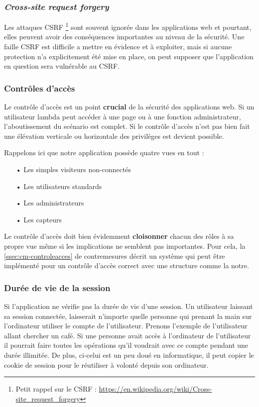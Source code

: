 \subsubsection{\emph{Cross-site request forgery}}

Les attaques CSRF \footnote{Petit rappel sur le CSRF : \url{https://en.wikipedia.org/wiki/Cross-site_request_forgery}} sont souvent ignorée dans les applications web et pourtant, elles peuvent avoir des conséquences importantes au niveau de la sécurité. Une faille CSRF est difficile a
mettre en évidence et à exploiter, mais si aucune protection n'a explicitement été mise en place, on peut supposer que l'application en question sera vulnérable au CSRF.

\subsubsection{Contrôles d'accès}

Le contrôle d'accès est un point \textbf{crucial} de la sécurité des applications web. Si un utilisateur lambda peut accéder à une page ou à une fonction administrateur, l'aboutissement du scénario est complet. Si le contrôle d'accès n'est pas bien fait une élévation verticale ou horizontale des privilèges est devient possible. 

Rappelons ici que notre application possède quatre vues en tout :

\begin{itemize}
\item[•] Les simples visiteurs non-connectés
\item[•] Les utilisateurs standards
\item[•] Les administrateurs
\item[•] Les capteurs
\end{itemize}

Le contrôle d'accès doit bien évidemment \textbf{cloisonner} chacun des rôles à sa propre vue même si les implications ne semblent pas importantes. Pour cela, la \autoref{ssec:cm-controleacces} de contremesures décrit un système qui peut être implémenté pour un contrôle d'accès correct avec une structure comme la notre.

\subsubsection{Durée de vie de la session}

Si l'application ne vérifie pas la durée de vie d'une session. Un utilisateur laissant sa session connectée, laisserait n'importe quelle personne qui prenant la main sur l'ordinateur utiliser le compte de l'utilisateur.
Prenons l'exemple de l'utilisateur allant chercher un café. Si une personne avait accès à l'ordinateur de l'utilisateur il pourrait faire toutes les opérations qu'il voudrait avec ce compte pendant une durée illimitée. De plus, ci-celui est un peu doué en informatique, il peut copier le cookie de session pour le réutiliser à volonté depuis son ordinateur.

